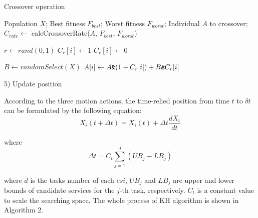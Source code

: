 \documentclass[10pt,journal,compsoc]{IEEEtran}
\begin{document}
\begin{algorithm}
\caption{Crossover operation}
\label{alg1}
\begin{algorithmic}[1]

\REQUIRE Population $X$; Best fitness $F_{best}$; Worst fitness $F_{worst}$; Individual $A$ to crossover;
\STATE $C_{rate} \leftarrow$ calcCrossoverRate($A$, $F_{best}$, $F_{worst}$)

\STATE $r \leftarrow rand(0,1)$
\STATE $C_r[i] \leftarrow 1$
\ELSE
\STATE $C_r[i] \leftarrow 0$
\ENDIF
\ENDFOR

\STATE $B \leftarrow randomSelect(X)$
\STATE $A[i] \leftarrow A \verb'&'  (1-C_r[i]) + B \verb'&' C_r[i]$ 
\ENDFOR

\end{algorithmic}
\end{algorithm}

5) Update position

According to the three motion actions, the time-relied position from time $t$ to $\delta t$ can be formulated by the following equation:
\begin{equation}
X_i(t+\Delta t) = X_i(t) + \Delta t \frac{dX_i}{dt}
\end{equation}

where
\begin{equation}
\Delta t = C_t\sum_{j=1}^{d}(UB_j - LB_j)
\end{equation}

where $d$ is the tasks number of each $csi$, $UB_j$ and $LB_j$ are upper and lower bounds of candidate services for the $j$-th task, respectively. $C_t$ is a constant value to scale the searching space. The  whole process of KH algorithm is shown in Algorithm 2.
\end{document}
